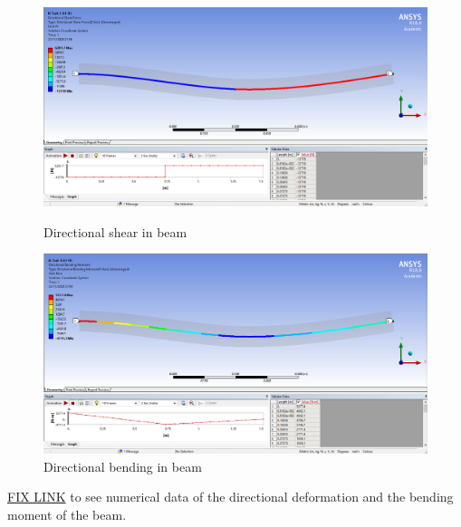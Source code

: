 \documentclass[11pt]{article}
\numberwithin{equation}{section}
\begin{document}
\begin{figure}[H]
  \centering
  \begin{minipage}[b]{0.49\textwidth}
    \includegraphics[width=\textwidth]{./img/DirectionalShearQ1.png}
    \caption{Directional shear in beam}
  \end{minipage}
  \hfill
  \begin{minipage}[b]{0.49\textwidth}
    \includegraphics[width=\textwidth]{./img/DirectionalBendingQ1.png}
    \caption{Directional bending in beam}
  \end{minipage}
\end{figure}
\href{https://github.com/hashadar/ME-Latex/tree/master/MECH0013/Topic%20Notes}{FIX LINK} to see numerical data of the directional deformation and the bending moment of the beam.
\end{document}
